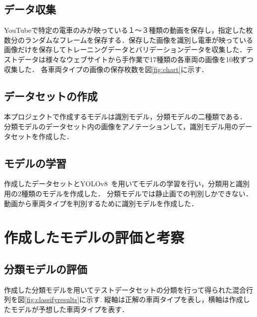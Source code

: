 \begin{multicols*}{2}
\subsection{データ収集}
YouTubeで特定の電車のみが映っている１〜３種類の動画を保存し，指定した枚数分のランダムなフレームを保存する．保存した画像を識別し電車が映っている画像だけを保存してトレーニングデータとバリデーションデータを収集した．テストデータは様々なウェブサイトから手作業で17種類の各車両の画像を10枚ずつ収集した．
各車両タイプの画像の保存枚数を図\ref{fig:chart}に示す．
\subsection{データセットの作成}
本プロジェクトで作成するモデルは識別モデル，分類モデルの二種類である．
分類モデルのデータセット内の画像をアノテーションして，識別モデル用のデータセットを作成した．


\subsection{モデルの学習}
作成したデータセットとYOLOv8~\cite{bk0}を用いてモデルの学習を行い，分類用と識別用の2種類のモデルを作成した．
分類モデルでは静止画での判別しかできない．動画から車両タイプを判別するために識別モデルを作成した．




\section{作成したモデルの評価と考察}
\subsection{分類モデルの評価}
作成した分類モデルを用いてテストデータセットの分類を行って得られた混合行列を図\ref{fig:classifyresults}に示す.
縦軸は正解の車両タイプを表し，横軸は作成したモデルが予想した車両タイプを表す．


\end{multicols*}
